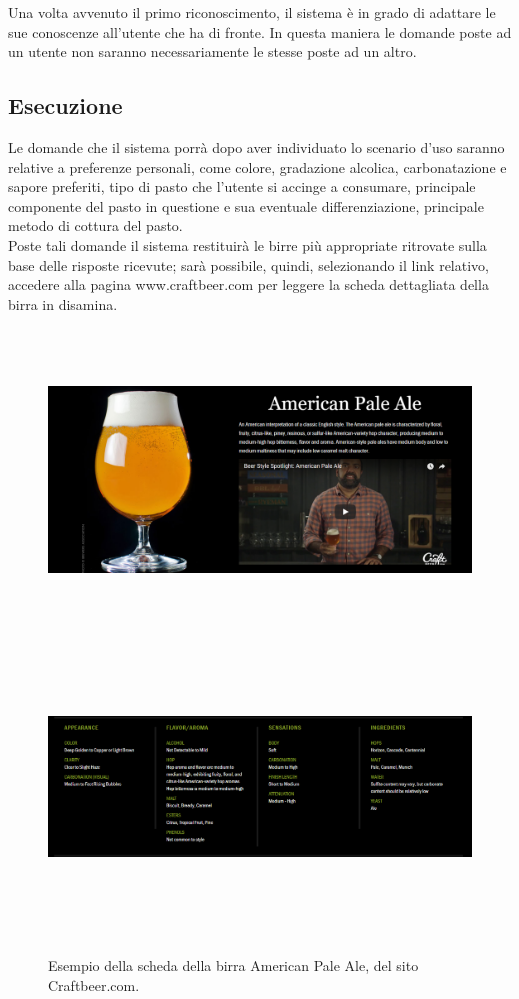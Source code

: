 \documentclass[12pt]{article}
\begin{document}
Una volta avvenuto il primo riconoscimento, il sistema è in grado di adattare le sue conoscenze all’utente che ha di fronte. In questa maniera le domande poste ad un utente non saranno necessariamente le stesse poste ad un altro.

\subsection{Esecuzione}

Le domande che il sistema porrà dopo aver individuato lo scenario d'uso saranno relative a preferenze personali, come colore, gradazione alcolica, carbonatazione e sapore preferiti, tipo di pasto che l’utente si accinge a consumare, principale componente del pasto in questione e sua eventuale differenziazione, principale metodo di cottura del pasto.
\\Poste tali domande il sistema restituirà le birre più appropriate ritrovate sulla base delle risposte ricevute; sarà possibile, quindi, selezionando il link relativo, accedere alla pagina www.craftbeer.com per leggere la scheda dettagliata della birra in disamina.

\begin{figure}[h]
\centering
\includegraphics[width=15cm,height=8cm,keepaspectratio]{img/beer.png}
\includegraphics[width=15cm,height=8cm,keepaspectratio]{img/details.png}
\caption{Esempio della scheda della birra American Pale Ale, del sito Craftbeer.com.}
\end{figure}
\end{document}
